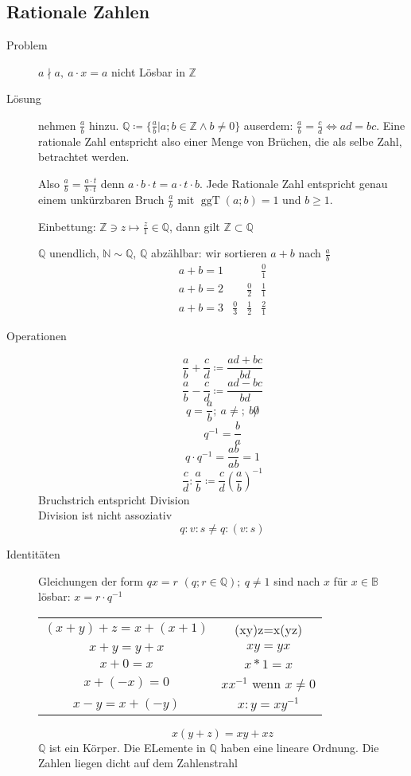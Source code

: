 \documentclass[12pt,a4paper]{article}
\DeclareMathOperator\ggt{ggT}
\begin{document}
\subsection{Rationale Zahlen}
\begin{description}
	\item[Problem] $a \nmid a,\ a \cdot x = a$ nicht Lösbar in $\mathbb{Z}$
	\item[Lösung] nehmen $\frac{a}{b}$ hinzu. $\mathbb{Q} \coloneqq \lbrace \frac{a}{b} | a;b \in \mathbb{Z} \wedge b \not = 0 \rbrace$ auserdem: $\frac{a}{b} = \frac{c}{d} \Leftrightarrow ad = bc$. Eine rationale Zahl entspricht also einer Menge von Brüchen, die als selbe Zahl, betrachtet werden.

		Also $\frac{a}{b} = \frac{a \cdot t}{b \cdot t}$ denn $a \cdot b \cdot t = a \cdot t \cdot b$. Jede Rationale Zahl entspricht genau einem unkürzbaren Bruch $\frac{a}{b}$ mit $\ggt(a;b) = 1$ und $b \geq 1$.

		Einbettung: $\mathbb{Z}\ni z \longmapsto \frac{z}{1} \in \mathbb{Q}$, dann gilt $\mathbb{Z} \subset \mathbb{Q}$

		$\mathbb{Q}$ unendlich, $\mathbb{N} \sim \mathbb{Q}$, $\mathbb{Q}$ abzählbar: wir sortieren $a + b$ nach $\frac{a}{b}$
		$$\begin{array}{lccc}
				a + b = 1 &             &             & \frac{0}{1} \\
				a + b = 2 &             & \frac{0}{2} & \frac{1}{1} \\
				a + b = 3 & \frac{0}{3} & \frac{1}{2} & \frac{2}{1}
			\end{array}$$
	\item[Operationen]
		$$\frac{a}{b} + \frac{c}{d} \coloneqq \frac{ad+bc}{bd}$$
		$$\frac{a}{b} - \frac{c}{d} \coloneqq \frac{ad-bc}{bd}$$
		$$q = \frac{a}{b};\ a \not =;\ b \not 0$$
		$$q^{-1} = \frac{b}{a}$$
		$$q \cdot q^{-1} = \frac{ab}{ab} = 1$$
		$$\frac{c}{d}:\frac{a}{b}\coloneqq\frac{c}{d}  \left(\frac{a}{b}\right)^{-1}$$
		Bruchstrich entspricht Division \\
		Division ist nicht assoziativ
		$$q:v:s \not = q:(v:s)$$
	\item[Identitäten] Gleichungen der form $qx=r$ $(q;r \in \mathbb{Q});\ q \not = 1$ sind nach $x$ für $x\in \mathbb{B}$ lösbar: $x = r \cdot q^{-1}$ \\
		\begin{tabular}[t]{cc}
			$(x+y)+z = x+(x+1)$ & (xy)z=x(yz)                 \\
			$x + y = y + x$     & $xy = yx$                   \\
			$x + 0 = x$         & $x * 1 = x$                 \\
			$x + (-x) = 0$      & $xx^{-1}$ wenn $x \not = 0$ \\
			$x - y = x + (-y)$  & $x:y = xy^{-1}$
		\end{tabular}
		$$x(y+z) = xy + xz$$
		$\mathbb{Q}$ ist ein Körper. Die ELemente in $\mathbb{Q}$ haben eine  lineare Ordnung. Die Zahlen liegen dicht auf dem Zahlenstrahl
\end{description}
\end{document}
